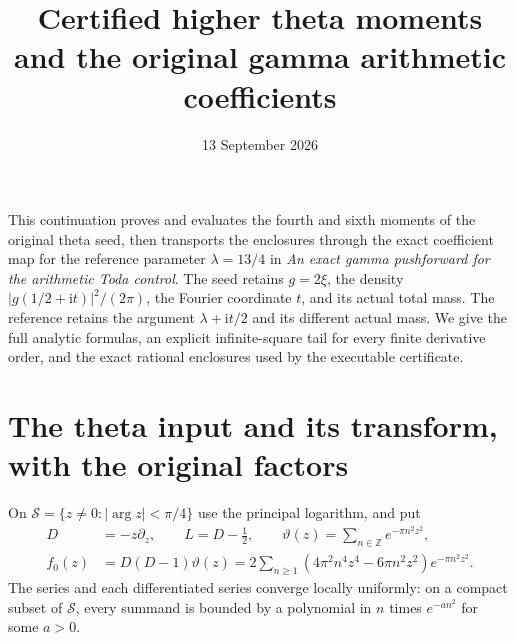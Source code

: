 \documentclass[11pt]{article}
\title{Certified higher theta moments and the original gamma arithmetic coefficients}
\author{}
\date{13 September 2026}
\newcommand{\ii}{\mathrm i}
\begin{document}
\maketitle

This continuation proves and evaluates the fourth and sixth moments of the
original theta seed, then transports the enclosures through the exact
coefficient map for the reference parameter $\lambda=13/4$ in
\emph{An exact gamma pushforward for the arithmetic Toda control}.
The seed retains $g=2\xi$, the density $|g(1/2+\ii t)|^2/(2\pi)$,
the Fourier coordinate $t$, and its actual total mass. The reference
retains the argument $\lambda+\ii t/2$ and its different actual mass.
We give the full analytic formulas, an explicit infinite-square tail for
every finite derivative order, and the exact rational enclosures used
by the executable certificate.

\section{The theta input and its transform, with the original factors}

On $\mathcal S=\{z\ne0:|\arg z|<\pi/4\}$ use the principal
logarithm, and put
\begin{align}
 D&=-z\partial_z,\qquad L=D-\tfrac12,\qquad
 \vartheta(z)=\sum_{n\in\mathbb Z}e^{-\pi n^2z^2},\tag{GS.1}\\
 f_0(z)&=D(D-1)\vartheta(z)
 =2\sum_{n\ge1}(4\pi^2n^4z^4-6\pi n^2z^2)e^{-\pi n^2z^2}.
 \tag{GS.2}
\end{align}
The series and each differentiated series converge locally uniformly:
on a compact subset of $\mathcal S$, every summand is bounded by
a polynomial in $n$ times $e^{-a n^2}$ for some $a>0$.
\end{document}
